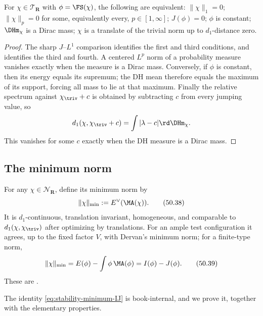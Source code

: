 \begin{corollary}
\label{cor:ch50-vanishing}
For $\chi\in\mathcal T_{\mathbf R}$ with $\phi=\FS(\chi)$, the
following are equivalent: $\|\chi\|_1=0$; $\|\chi\|_p=0$ for
some, equivalently every, $p\in[1,\infty]$; $J(\phi)=0$;
$\phi$ is constant; $\DHm_\chi$ is a Dirac mass; $\chi$ is a
translate of the trivial norm up to $d_1$-distance zero.
\end{corollary}

\begin{proof}
The sharp $J$--$L^1$ comparison identifies the first and third
conditions, and  identifies the third and fourth.
A centered $L^p$ norm of a probability measure vanishes exactly when
the measure is a Dirac mass.  Conversely, if $\phi$ is constant, then
its energy equals its supremum; the DH mean therefore equals the maximum
of its support, forcing all mass to lie at that maximum.  Finally the
relative spectrum against $\chi_{\triv}+c$ is obtained by subtracting
$c$ from every jumping value, so
\[
 d_1(\chi,\chi_{\triv}+c)=\int|\lambda-c|\rd\DHm_\chi.
\]
This vanishes for some $c$ exactly when the DH measure is a Dirac mass.
\end{proof}

\subsection{The minimum norm}
\label{sec:ch50-minimum-norm}

For any $\chi\in\mathcal N_{\mathbf R}$, define its minimum norm by
\[
                   \|\chi\|_{\min}
                   :=E^\vee(\MA(\chi)).
\tag{50.38}\label{eq:stability-minimum-norm}
\]
It is $d_1$-continuous, translation invariant, homogeneous, and
comparable to $d_1(\chi,\chi_{\triv})$ after optimizing by translations.
For an ample test configuration it agrees, up to the fixed factor $V$,
with Dervan's minimum norm; for a finite-type norm,
\[
 \|\chi\|_{\min}
   =E(\phi)-\int\phi\,\MA(\phi)=I(\phi)-J(\phi).
\tag{50.39}\label{eq:stability-minimum-IJ}
\]
These are \cite[Definition~7.19 and Proposition~7.20]{BJKS1}.

The identity \eqref{eq:stability-minimum-IJ} is book-internal, and we prove
it, together with the elementary properties.

